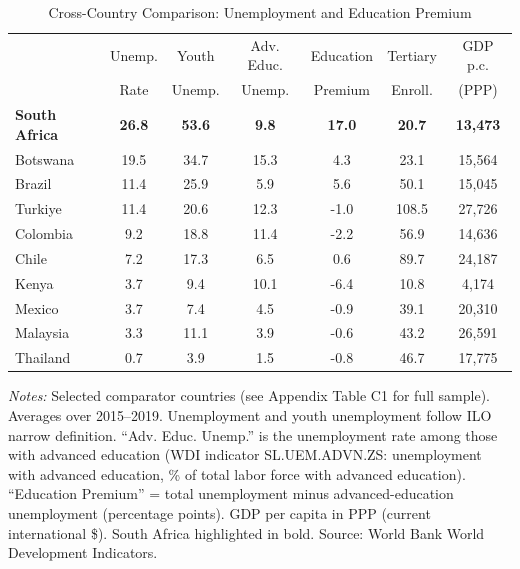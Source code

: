 \begin{table}[H]
\centering
\caption{Cross-Country Comparison: Unemployment and Education Premium}
\label{tab:cross_country}
\begin{threeparttable}
\begin{tabular}{lcccccc}
\toprule
 & Unemp. & Youth & Adv. Educ. & Education & Tertiary & GDP p.c. \\
 & Rate & Unemp. & Unemp. & Premium & Enroll. & (PPP) \\
\midrule
\textbf{South Africa} & \textbf{26.8} & \textbf{53.6} & \textbf{9.8} & \textbf{17.0} & \textbf{20.7} & \textbf{13,473} \\
Botswana & 19.5 & 34.7 & 15.3 & 4.3 & 23.1 & 15,564 \\
Brazil & 11.4 & 25.9 & 5.9 & 5.6 & 50.1 & 15,045 \\
Turkiye & 11.4 & 20.6 & 12.3 & -1.0 & 108.5 & 27,726 \\
Colombia & 9.2 & 18.8 & 11.4 & -2.2 & 56.9 & 14,636 \\
Chile & 7.2 & 17.3 & 6.5 & 0.6 & 89.7 & 24,187 \\
Kenya & 3.7 & 9.4 & 10.1 & -6.4 & 10.8 & 4,174 \\
Mexico & 3.7 & 7.4 & 4.5 & -0.9 & 39.1 & 20,310 \\
Malaysia & 3.3 & 11.1 & 3.9 & -0.6 & 43.2 & 26,591 \\
Thailand & 0.7 & 3.9 & 1.5 & -0.8 & 46.7 & 17,775 \\
\bottomrule
\end{tabular}
\begin{tablenotes}[flushleft]
\small
\item \textit{Notes:} Selected comparator countries (see Appendix Table C1 for full sample). Averages over 2015--2019. Unemployment and youth unemployment follow ILO narrow definition. ``Adv. Educ. Unemp.'' is the unemployment rate among those with advanced education (WDI indicator SL.UEM.ADVN.ZS: unemployment with advanced education, \% of total labor force with advanced education). ``Education Premium'' = total unemployment minus advanced-education unemployment (percentage points). GDP per capita in PPP (current international \$). South Africa highlighted in bold. Source: World Bank World Development Indicators.
\end{tablenotes}
\end{threeparttable}
\end{table}
